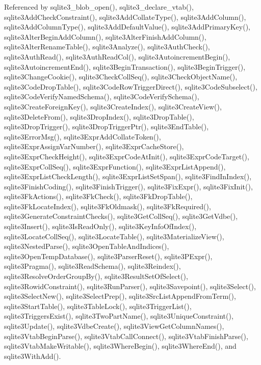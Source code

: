 Referenced by sqlite3\+\_\+blob\+\_\+open(), sqlite3\+\_\+declare\+\_\+vtab(), sqlite3\+Add\+Check\+Constraint(), sqlite3\+Add\+Collate\+Type(), sqlite3\+Add\+Column(), sqlite3\+Add\+Column\+Type(), sqlite3\+Add\+Default\+Value(), sqlite3\+Add\+Primary\+Key(), sqlite3\+Alter\+Begin\+Add\+Column(), sqlite3\+Alter\+Finish\+Add\+Column(), sqlite3\+Alter\+Rename\+Table(), sqlite3\+Analyze(), sqlite3\+Auth\+Check(), sqlite3\+Auth\+Read(), sqlite3\+Auth\+Read\+Col(), sqlite3\+Autoincrement\+Begin(), sqlite3\+Autoincrement\+End(), sqlite3\+Begin\+Transaction(), sqlite3\+Begin\+Trigger(), sqlite3\+Change\+Cookie(), sqlite3\+Check\+Coll\+Seq(), sqlite3\+Check\+Object\+Name(), sqlite3\+Code\+Drop\+Table(), sqlite3\+Code\+Row\+Trigger\+Direct(), sqlite3\+Code\+Subselect(), sqlite3\+Code\+Verify\+Named\+Schema(), sqlite3\+Code\+Verify\+Schema(), sqlite3\+Create\+Foreign\+Key(), sqlite3\+Create\+Index(), sqlite3\+Create\+View(), sqlite3\+Delete\+From(), sqlite3\+Drop\+Index(), sqlite3\+Drop\+Table(), sqlite3\+Drop\+Trigger(), sqlite3\+Drop\+Trigger\+Ptr(), sqlite3\+End\+Table(), sqlite3\+Error\+Msg(), sqlite3\+Expr\+Add\+Collate\+Token(), sqlite3\+Expr\+Assign\+Var\+Number(), sqlite3\+Expr\+Cache\+Store(), sqlite3\+Expr\+Check\+Height(), sqlite3\+Expr\+Code\+At\+Init(), sqlite3\+Expr\+Code\+Target(), sqlite3\+Expr\+Coll\+Seq(), sqlite3\+Expr\+Function(), sqlite3\+Expr\+List\+Append(), sqlite3\+Expr\+List\+Check\+Length(), sqlite3\+Expr\+List\+Set\+Span(), sqlite3\+Find\+In\+Index(), sqlite3\+Finish\+Coding(), sqlite3\+Finish\+Trigger(), sqlite3\+Fix\+Expr(), sqlite3\+Fix\+Init(), sqlite3\+Fk\+Actions(), sqlite3\+Fk\+Check(), sqlite3\+Fk\+Drop\+Table(), sqlite3\+Fk\+Locate\+Index(), sqlite3\+Fk\+Oldmask(), sqlite3\+Fk\+Required(), sqlite3\+Generate\+Constraint\+Checks(), sqlite3\+Get\+Coll\+Seq(), sqlite3\+Get\+Vdbe(), sqlite3\+Insert(), sqlite3\+Is\+Read\+Only(), sqlite3\+Key\+Info\+Of\+Index(), sqlite3\+Locate\+Coll\+Seq(), sqlite3\+Locate\+Table(), sqlite3\+Materialize\+View(), sqlite3\+Nested\+Parse(), sqlite3\+Open\+Table\+And\+Indices(), sqlite3\+Open\+Temp\+Database(), sqlite3\+Parser\+Reset(), sqlite3\+P\+Expr(), sqlite3\+Pragma(), sqlite3\+Read\+Schema(), sqlite3\+Reindex(), sqlite3\+Resolve\+Order\+Group\+By(), sqlite3\+Result\+Set\+Of\+Select(), sqlite3\+Rowid\+Constraint(), sqlite3\+Run\+Parser(), sqlite3\+Savepoint(), sqlite3\+Select(), sqlite3\+Select\+New(), sqlite3\+Select\+Prep(), sqlite3\+Src\+List\+Append\+From\+Term(), sqlite3\+Start\+Table(), sqlite3\+Table\+Lock(), sqlite3\+Trigger\+List(), sqlite3\+Triggers\+Exist(), sqlite3\+Two\+Part\+Name(), sqlite3\+Unique\+Constraint(), sqlite3\+Update(), sqlite3\+Vdbe\+Create(), sqlite3\+View\+Get\+Column\+Names(), sqlite3\+Vtab\+Begin\+Parse(), sqlite3\+Vtab\+Call\+Connect(), sqlite3\+Vtab\+Finish\+Parse(), sqlite3\+Vtab\+Make\+Writable(), sqlite3\+Where\+Begin(), sqlite3\+Where\+End(), and sqlite3\+With\+Add().

